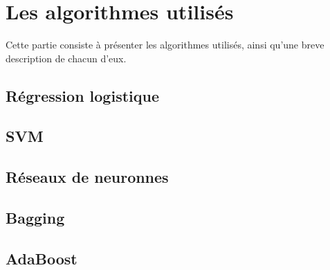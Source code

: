 \chapter{Les algorithmes utilisés}
\par Cette partie consiste à présenter les algorithmes utilisés, ainsi qu'une breve description de chacun d'eux.
\section{Régression logistique}
\par
\section{SVM}
\par
\section{Réseaux de neuronnes}
\par
\section{Bagging}
\par
\section{AdaBoost}

